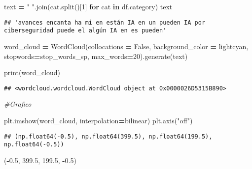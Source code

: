 \documentclass[
]{article}
\newenvironment{Shaded}{\begin{snugshade}}{\end{snugshade}}
\newcommand{\BuiltInTok}[1]{#1}
\newcommand{\CommentTok}[1]{\textcolor[rgb]{0.56,0.35,0.01}{\textit{#1}}}
\newcommand{\ControlFlowTok}[1]{\textcolor[rgb]{0.13,0.29,0.53}{\textbf{#1}}}
\newcommand{\DecValTok}[1]{\textcolor[rgb]{0.00,0.00,0.81}{#1}}
\newcommand{\FloatTok}[1]{\textcolor[rgb]{0.00,0.00,0.81}{#1}}
\newcommand{\KeywordTok}[1]{\textcolor[rgb]{0.13,0.29,0.53}{\textbf{#1}}}
\newcommand{\NormalTok}[1]{#1}
\newcommand{\OperatorTok}[1]{\textcolor[rgb]{0.81,0.36,0.00}{\textbf{#1}}}
\newcommand{\StringTok}[1]{\textcolor[rgb]{0.31,0.60,0.02}{#1}}
\newcommand{\VariableTok}[1]{\textcolor[rgb]{0.00,0.00,0.00}{#1}}
\begin{document}
\begin{Shaded}
\begin{Highlighting}[]
\NormalTok{text }\OperatorTok{=} \StringTok{" "}\NormalTok{.join(cat.split()[}\DecValTok{1}\NormalTok{] }\ControlFlowTok{for}\NormalTok{ cat }\KeywordTok{in}\NormalTok{ df.category)}
\NormalTok{text}
\end{Highlighting}
\end{Shaded}

\begin{verbatim}
## 'avances encanta ha mi en están IA en un pueden IA por ciberseguridad puede el algún IA en es pueden'
\end{verbatim}

\begin{Shaded}
\begin{Highlighting}[]
\NormalTok{word\_cloud }\OperatorTok{=}\NormalTok{ WordCloud(collocations }\OperatorTok{=} \VariableTok{False}\NormalTok{, background\_color }\OperatorTok{=} \StringTok{\textquotesingle{}lightcyan\textquotesingle{}}\NormalTok{, stopwords}\OperatorTok{=}\NormalTok{stop\_words\_sp, max\_words}\OperatorTok{=}\DecValTok{20}\NormalTok{).generate(text)}
 
\BuiltInTok{print}\NormalTok{(word\_cloud)}
\end{Highlighting}
\end{Shaded}

\begin{verbatim}
## <wordcloud.wordcloud.WordCloud object at 0x0000026D5315B890>
\end{verbatim}

\begin{Shaded}
\begin{Highlighting}[]
\CommentTok{\#Grafico}

\NormalTok{plt.imshow(word\_cloud, interpolation}\OperatorTok{=}\StringTok{\textquotesingle{}bilinear\textquotesingle{}}\NormalTok{)}
\NormalTok{plt.axis(}\StringTok{"off"}\NormalTok{)}
\end{Highlighting}
\end{Shaded}

\begin{verbatim}
## (np.float64(-0.5), np.float64(399.5), np.float64(199.5), np.float64(-0.5))
\end{verbatim}

\begin{Shaded}
\begin{Highlighting}[]
\NormalTok{(}\OperatorTok{{-}}\FloatTok{0.5}\NormalTok{, }\FloatTok{399.5}\NormalTok{, }\FloatTok{199.5}\NormalTok{, }\OperatorTok{{-}}\FloatTok{0.5}\NormalTok{)}
\end{Highlighting}
\end{Shaded}
\end{document}
